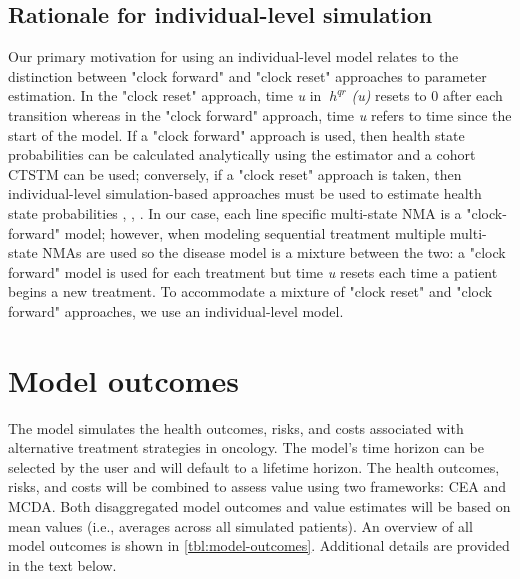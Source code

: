 \documentclass[11pt,final,fleqn]{article}\usepackage[]{graphicx}\usepackage[]{color}
\theoremstyle{plain}
\begin{document}
{\subsection{Rationale for individual-level simulation}
Our primary motivation for using an individual-level model relates to the distinction between "clock forward" and "clock reset" approaches to parameter estimation. In the "clock reset" approach, time \textit{u} in $\ h^{qr} $ \textit{(u)} resets to 0 after each transition whereas in the "clock forward" approach, time \textit{u} refers to time since the start of the model. If a "clock forward" approach is used, then health state probabilities can be calculated analytically using the \citet{aalen1978empirical} estimator and a cohort CTSTM can be used; conversely, if a "clock reset" approach is taken, then individual-level simulation-based approaches must be used to estimate health state probabilities \citep{putter2007tutorial}, \citep{de2011mstate}, \citep{jackson2016flexsurv}. In our case, each line specific multi-state NMA is a "clock-forward" model; however, when modeling sequential treatment multiple multi-state NMAs are used so the disease model is a mixture between the two: a "clock forward" model is used for each treatment but time \textit{u} resets each time a patient begins a new treatment. To accommodate a mixture of "clock reset" and "clock forward" approaches, we use an individual-level model. 


\section{Model outcomes}\label{sec:model-outcomes}
The model simulates the health outcomes, risks, and costs associated with alternative treatment strategies in oncology. The model's time horizon can be selected by the user and will default to a lifetime horizon. The health outcomes, risks, and costs will be combined to assess value using two frameworks: CEA and MCDA. Both disaggregated model outcomes and value estimates will be based on mean values (i.e., averages across all simulated patients). An overview of all model outcomes is shown in \autoref{tbl:model-outcomes}. Additional details are provided in the text below.  

}
\end{document}

